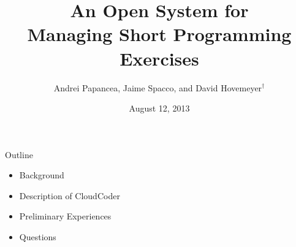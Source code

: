 \documentclass{beamer}
\begin{document}
\title[ICER 2013]{An Open System for\\
Managing Short Programming Exercises}
\author[Papancea et.\ al.]{Andrei Papancea, Jaime Spacco, and David Hovemeyer${}^{\dagger}$}
\date[August, 2013]{August 12, 2013}

\begin{frame}[plain]
  \titlepage
\end{frame}

\begin{frame}{Outline}

\begin{itemize}
  \item Background
  \item Description of CloudCoder
  \item Preliminary Experiences
  \item Questions
\end{itemize}

\end{frame}
\end{document}
